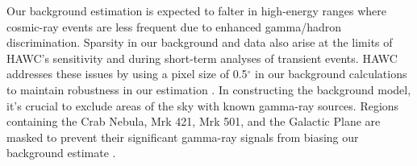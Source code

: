 Our background estimation is expected to falter in high-energy ranges where cosmic-ray events are less frequent due to enhanced gamma/hadron discrimination. Sparsity in our background and data also arise at the limits of HAWC's sensitivity and during short-term analyses of transient events.
HAWC addresses these issues by using a pixel size of 0.5$^\circ$ in our background calculations to maintain robustness in our estimation \cite{Abeysekara_2017,wcd_Sensitivity}.
In constructing the background model, it's crucial to exclude areas of the sky with known gamma-ray sources.
Regions containing the Crab Nebula, Mrk 421, Mrk 501, and the Galactic Plane are masked to prevent their significant gamma-ray signals from biasing our background estimate \cite{Abeysekara_2017}.
